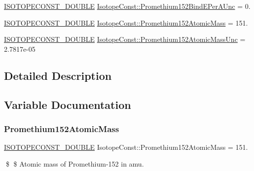 \begin{DoxyCompactItemize}
\item 
\mbox{\hyperlink{group___isotope_const-_macros_ga8f45a7272ce02c0b4c65c44636ed719a}{I\+S\+O\+T\+O\+P\+E\+C\+O\+N\+S\+T\+\_\+\+D\+O\+U\+B\+LE}} \mbox{\hyperlink{group___isotope_const-_promethium-_pm152_ga6a6b800857813f498e40b0e74657afc4}{Isotope\+Const\+::\+Promethium152\+Bind\+E\+Per\+A\+Unc}} = 0.
\item 
\mbox{\hyperlink{group___isotope_const-_macros_ga8f45a7272ce02c0b4c65c44636ed719a}{I\+S\+O\+T\+O\+P\+E\+C\+O\+N\+S\+T\+\_\+\+D\+O\+U\+B\+LE}} \mbox{\hyperlink{group___isotope_const-_promethium-_pm152_ga424d3b1ec4e4e7e6b41eb62ff8c05687}{Isotope\+Const\+::\+Promethium152\+Atomic\+Mass}} = 151.
\item 
\mbox{\hyperlink{group___isotope_const-_macros_ga8f45a7272ce02c0b4c65c44636ed719a}{I\+S\+O\+T\+O\+P\+E\+C\+O\+N\+S\+T\+\_\+\+D\+O\+U\+B\+LE}} \mbox{\hyperlink{group___isotope_const-_promethium-_pm152_ga890f0b72372bfd3b10705759a0fc8f7d}{Isotope\+Const\+::\+Promethium152\+Atomic\+Mass\+Unc}} = 2.\+7817e-\/05
\end{DoxyCompactItemize}


\subsection{Detailed Description}


\subsection{Variable Documentation}
\mbox{\label{group___isotope_const-_promethium-_pm152_ga424d3b1ec4e4e7e6b41eb62ff8c05687}} 
\subsubsection{\texorpdfstring{Promethium152\+Atomic\+Mass}{Promethium152AtomicMass}}
{\footnotesize\ttfamily \mbox{\hyperlink{group___isotope_const-_macros_ga8f45a7272ce02c0b4c65c44636ed719a}{I\+S\+O\+T\+O\+P\+E\+C\+O\+N\+S\+T\+\_\+\+D\+O\+U\+B\+LE}} Isotope\+Const\+::\+Promethium152\+Atomic\+Mass = 151.}

\$ \$ Atomic mass of Promethium-\/152 in amu. \mbox{\label{group___isotope_const-_promethium-_pm152_ga890f0b72372bfd3b10705759a0fc8f7d}} 

